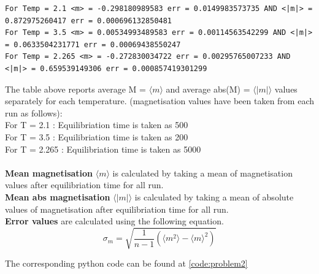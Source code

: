 \documentclass[a4paper,11pt]{article}
\begin{document}
\begin{lstlisting}[caption=Average magnetization values]
For Temp = 2.1 <m> = -0.298180989583 err = 0.0149983573735 AND <|m|> = 0.872975260417 err = 0.000696132850481
For Temp = 3.5 <m> = 0.00534993489583 err = 0.00114563542299 AND <|m|> = 0.0633504231771 err = 0.00069438550247
For Temp = 2.265 <m> = -0.272830034722 err = 0.00295765007233 AND <|m|> = 0.659539149306 err = 0.000857419301299
\end{lstlisting}
The table above reports average M = $\langle m \rangle$ and average abs(M) = $\langle \left|m\right| \rangle$ values separately for each temperature. (magnetisation values have been taken from each run as follows):\\
For T = 2.1 : Equilibriation time is taken as 500\\
For T = 3.5 : Equilibriation time is taken as 200\\
For T = 2.265 : Equilibriation time is taken as 5000\\ \\
\textbf{Mean magnetisation} $\langle m \rangle$ is calculated by taking a mean of magnetisation values after equilibriation time for all run.\\
\textbf{Mean abs magnetisation} $\langle \left|m\right| \rangle$ is calculated by taking a mean of absolute values of magnetisation after equilibriation time for all run.\\
\textbf{Error values} are calculated using the following equation.\\
\begin{equation}
    \sigma_{m} = \sqrt{\frac{1}{n-1}(\langle m^{2} \rangle - \langle m \rangle^{2})}
\end{equation}


The corresponding python code can be found at \ref{code:problem2}
\end{document}
